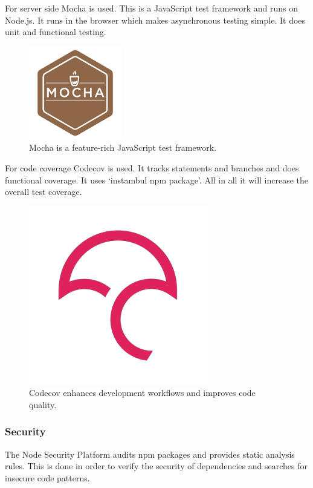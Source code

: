 For server side Mocha is used. This is a JavaScript test framework and runs on Node.js. It runs in the browser which makes asynchronous testing simple. It does unit and functional testing.

\begin{figure}[h]
  \begin{center}
    \includegraphics[scale=0.5]{./images/mocha.png}
    \caption{Mocha is a feature-rich JavaScript test framework.}
    \label{fig:}
  \end{center}
\end{figure}

For code coverage Codecov is used. It tracks statements and branches and does functional coverage. It uses `instambul npm package'. All in all it will increase the overall test coverage.

\begin{figure}[h]
  \begin{center}
    \includegraphics[scale=0.5]{./images/codecov.png}
    \caption{Codecov enhances development workflows and improves code quality.}
    \label{fig:}
  \end{center}
\end{figure}


\subsubsection{Security}
The Node Security Platform audits npm packages and provides static analysis rules. This is done in order to verify the security of dependencies and searches for insecure code patterns.


